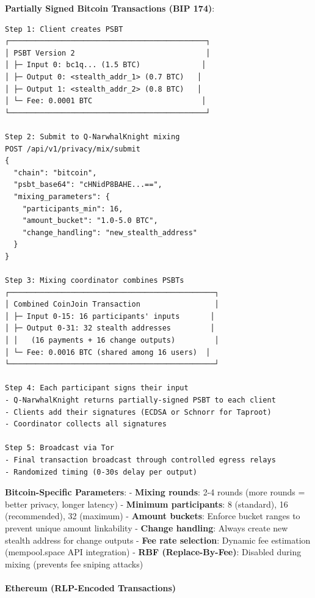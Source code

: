 \documentclass[
  11pt,
]{article}
\begin{document}
\textbf{Partially Signed Bitcoin Transactions (BIP 174)}:

\begin{verbatim}
Step 1: Client creates PSBT
┌─────────────────────────────────────────────┐
│ PSBT Version 2                              │
│ ├─ Input 0: bc1q... (1.5 BTC)              │
│ ├─ Output 0: <stealth_addr_1> (0.7 BTC)   │
│ ├─ Output 1: <stealth_addr_2> (0.8 BTC)   │
│ └─ Fee: 0.0001 BTC                         │
└─────────────────────────────────────────────┘

Step 2: Submit to Q-NarwhalKnight mixing
POST /api/v1/privacy/mix/submit
{
  "chain": "bitcoin",
  "psbt_base64": "cHNidP8BAHE...==",
  "mixing_parameters": {
    "participants_min": 16,
    "amount_bucket": "1.0-5.0 BTC",
    "change_handling": "new_stealth_address"
  }
}

Step 3: Mixing coordinator combines PSBTs
┌───────────────────────────────────────────────┐
│ Combined CoinJoin Transaction                 │
│ ├─ Input 0-15: 16 participants' inputs       │
│ ├─ Output 0-31: 32 stealth addresses         │
│ │   (16 payments + 16 change outputs)         │
│ └─ Fee: 0.0016 BTC (shared among 16 users)  │
└───────────────────────────────────────────────┘

Step 4: Each participant signs their input
- Q-NarwhalKnight returns partially-signed PSBT to each client
- Clients add their signatures (ECDSA or Schnorr for Taproot)
- Coordinator collects all signatures

Step 5: Broadcast via Tor
- Final transaction broadcast through controlled egress relays
- Randomized timing (0-30s delay per output)
\end{verbatim}

\textbf{Bitcoin-Specific Parameters}: - \textbf{Mixing rounds}: 2-4
rounds (more rounds = better privacy, longer latency) - \textbf{Minimum
participants}: 8 (standard), 16 (recommended), 32 (maximum) -
\textbf{Amount buckets}: Enforce bucket ranges to prevent unique amount
linkability - \textbf{Change handling}: Always create new stealth
address for change outputs - \textbf{Fee rate selection}: Dynamic fee
estimation (mempool.space API integration) - \textbf{RBF
(Replace-By-Fee)}: Disabled during mixing (prevents fee sniping attacks)

\hypertarget{ethereum-rlp-encoded-transactions}{%
\paragraph{Ethereum (RLP-Encoded
Transactions)}\label{ethereum-rlp-encoded-transactions}}
\end{document}
